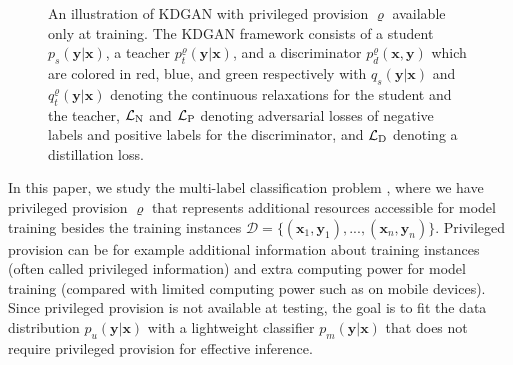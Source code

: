 \documentclass{article}
\newcommand{\OVEC}[1]{\bm{#1}} %
\newcommand{\SVEC}[1]{\check{\bm{#1}}}
\newcommand{\LOSS}[2]{\mathcal{#1}_{\rm{#2}}} %
\newcommand{\EXP}{\mathbb{E}} %
\newcommand{\DTN}{\mathcal{L}_{\rm{D}}}
\newcommand{\pclf}{p_{m}(\OVEC{y}|\OVEC{x})}
\newcommand{\abbrpdat}{p_{u}}
\newcommand{\fullpdat}{p_{u}(\OVEC{y}|\OVEC{x})}
\newcommand{\abbrpstd}{p_{s}}
\newcommand{\fullpstd}[1]{p_{s}(#1|\OVEC{x})}
\newcommand{\fullqstd}[1]{q_{s}(#1|\OVEC{x})}
\newcommand{\abbrptch}{p_{t}^{\varrho}}
\newcommand{\fullptch}[1]{p_{t}^{\varrho}(#1|\OVEC{x})}
\newcommand{\fullqtch}[1]{q_{t}^{\varrho}(#1|\OVEC{x})}
\newcommand{\fullpdis}[1]{p_{d}^{\varrho}(\OVEC{x},#1)}
\newcommand{\traindata}{\mathcal{D}}
\begin{document}
\begin{figure}[tbp]
\caption{
An illustration of KDGAN with privileged provision $\varrho$ available only at training.
The KDGAN framework consists of a student $\fullpstd{\OVEC{y}}$, a teacher $\fullptch{\OVEC{y}}$, and a discriminator  $\fullpdis{\OVEC{y}}$ which are colored in red, blue, and green respectively with $\fullqstd{\OVEC{y}}$ and $\fullqtch{\OVEC{y}}$ denoting the continuous relaxations for the student and the teacher, $\LOSS{L}{N}$ and $\LOSS{L}{P}$ denoting adversarial losses of negative labels and positive labels for the discriminator, and $\DTN$ denoting a distillation loss.
}
\label{fig:kdgan}
\end{figure}

In this paper, we study the multi-label classification problem \cite{hinton2015distilling,lopez2015unifying,vapnik2015learning}, where we have privileged provision $\varrho$ that represents additional resources accessible for model training besides the training instances $\traindata=\{(\OVEC{x}_{1},\OVEC{y}_{1}),...,(\OVEC{x}_{n},\OVEC{y}_{n})\}$.
Privileged provision can be for example additional information about training instances \cite{vapnik2015learning} (often called privileged information) and extra computing power for model training \cite{ba2014deep,hinton2015distilling,sau2016deep} (compared with limited computing power such as on mobile devices).
Since privileged provision is not available at testing, the goal is to fit the data distribution $\fullpdat$ with a lightweight classifier $\pclf$ that does not require privileged provision for effective inference.
\end{document}
